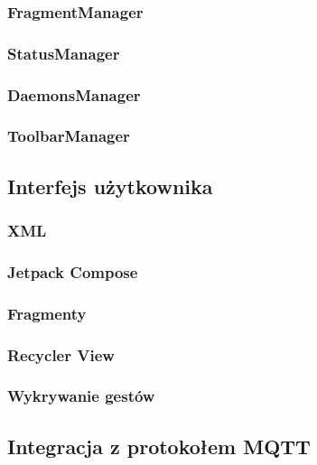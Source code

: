 \newpage

\subsubsection{FragmentManager}
\subsubsection{StatusManager}
\subsubsection{DaemonsManager}
\subsubsection{ToolbarManager}

\subsection{Interfejs użytkownika}
\subsubsection{XML}
\subsubsection{Jetpack Compose}
\subsubsection{Fragmenty}
\subsubsection{Recycler View}
\subsubsection{Wykrywanie gestów}

\subsection{Integracja z protokołem MQTT}

\begin{lstlisting}[language=Kotlin]
\end{lstlisting}